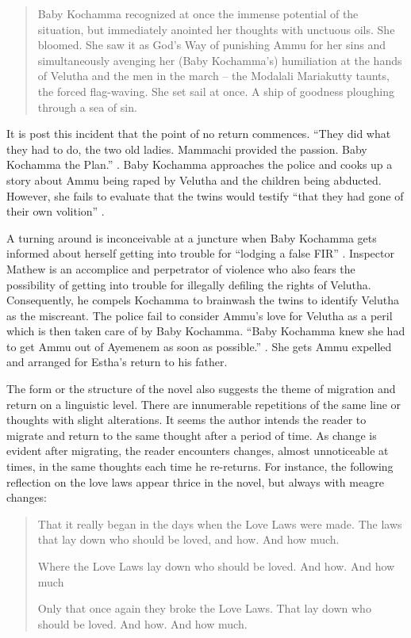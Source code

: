 \begin{quote}
  Baby Kochamma recognized at once the immense potential of the situation, but immediately anointed her thoughts with unctuous oils. She bloomed. She saw it as God's Way of punishing Ammu for her sins and simultaneously avenging her (Baby Kochamma's) humiliation at the hands of Velutha and the men in the march – the Modalali Mariakutty taunts, the forced flag-waving. She set sail at once. A ship of goodness ploughing through a sea of sin. \parencite[257]{Roy1997}
\end{quote}

It is post this incident that the point of no return commences. ``They did what they had to do, the two old ladies. Mammachi provided the passion. Baby Kochamma the Plan.'' \parencite[258]{Roy1997}. Baby Kochamma approaches the police and cooks up a story about Ammu being raped by Velutha and the children being abducted. However, she fails to evaluate that the twins would testify ``that they had gone of their own volition'' \parencite[314]{Roy1997}. 

A turning around is inconceivable at a juncture when Baby Kochamma gets informed about herself getting into trouble for ``lodging a false FIR'' \parencite[315]{Roy1997}. Inspector Mathew is an accomplice and perpetrator of violence who also fears the possibility of getting into trouble for illegally defiling the rights of Velutha. Consequently, he compels Kochamma to brainwash the twins to identify Velutha as the miscreant. The police fail to consider Ammu's love for Velutha as a peril which is then taken care of by Baby Kochamma. ``Baby Kochamma knew she had to get Ammu out of Ayemenem as soon as possible.'' \parencite[321]{Roy1997}. She gets Ammu expelled and arranged for Estha's return to his father.

The form or the structure of the novel also suggests the theme of migration and return on a linguistic level. There are innumerable repetitions of the same line or thoughts with slight alterations. It seems the author intends the reader to migrate and return to the same thought after a period of time. As change is evident after migrating, the reader encounters changes, almost unnoticeable at times, in the same thoughts each time he re-returns. For instance, the following reflection on the love laws appear thrice in the novel, but always with meagre changes: 

\begin{quote}
  That it really began in the days when the Love Laws were made. The laws that lay down who should be loved, and how. And how much. \parencite[33]{Roy1997} 

  Where the Love Laws lay down who should be loved. And how. And how much \parencite[177]{Roy1997} 

  Only that once again they broke the Love Laws. That lay down who should be loved. And how. And how much. \parencite[328]{Roy1997} 
\end{quote}

